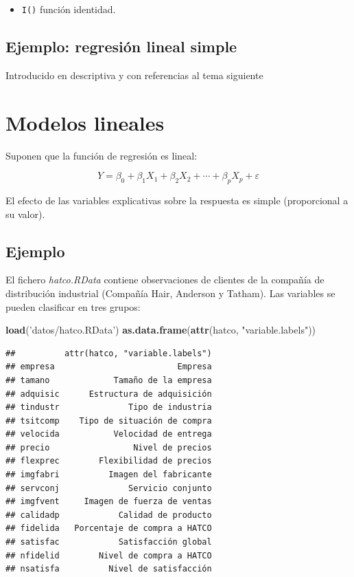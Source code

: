 \documentclass[]{book}
\newenvironment{Shaded}{\begin{snugshade}}{\end{snugshade}}
\newcommand{\KeywordTok}[1]{\textcolor[rgb]{0.13,0.29,0.53}{\textbf{#1}}}
\newcommand{\StringTok}[1]{\textcolor[rgb]{0.31,0.60,0.02}{#1}}
\newcommand{\NormalTok}[1]{#1}
\providecommand{\tightlist}{%
  \setlength{\itemsep}{0pt}\setlength{\parskip}{0pt}}
\begin{document}
\begin{itemize}
\tightlist
\item
  \texttt{I()} función identidad.
\end{itemize}

\section{Ejemplo: regresión lineal
simple}\label{ejemplo-regresion-lineal-simple}

Introducido en descriptiva y con referencias al tema siguiente

\chapter{Modelos lineales}\label{modelos-lineales}

Suponen que la función de regresión es lineal:

\[Y=\beta_{0}+\beta_{1}X_{1}+\beta_{2}X_{2}+\cdots+\beta_{p}X_{p}+\varepsilon\]

El efecto de las variables explicativas sobre la respuesta es simple
(proporcional a su valor).

\section{Ejemplo}\label{ejemplo}

El fichero \emph{hatco.RData} contiene observaciones de clientes de la
compañía de distribución industrial (Compañía Hair, Anderson y Tatham).
Las variables se pueden clasificar en tres grupos:

\begin{Shaded}
\begin{Highlighting}[]
\KeywordTok{load}\NormalTok{(}\StringTok{'datos/hatco.RData'}\NormalTok{)}
\KeywordTok{as.data.frame}\NormalTok{(}\KeywordTok{attr}\NormalTok{(hatco, }\StringTok{"variable.labels"}\NormalTok{))}
\end{Highlighting}
\end{Shaded}

\begin{verbatim}
##          attr(hatco, "variable.labels")
## empresa                         Empresa
## tamano             Tamaño de la empresa
## adquisic      Estructura de adquisición
## tindustr              Tipo de industria
## tsitcomp    Tipo de situación de compra
## velocida           Velocidad de entrega
## precio                 Nivel de precios
## flexprec        Flexibilidad de precios
## imgfabri          Imagen del fabricante
## servconj              Servicio conjunto
## imgfvent     Imagen de fuerza de ventas
## calidadp            Calidad de producto
## fidelida   Porcentaje de compra a HATCO
## satisfac            Satisfacción global
## nfidelid        Nivel de compra a HATCO
## nsatisfa          Nivel de satisfacción
\end{verbatim}
\end{document}
